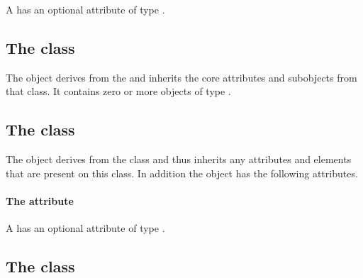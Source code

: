 A \CSGObject has an optional attribute  of type
.


\subsection{The  class}
\label{listofcsgnodes-class}


The \ListOfCSGNodes object derives from the  and inherits
the core attributes and subobjects from that class. It contains zero or
more objects of type \CSGNode.

\subsection{The  class}
\label{csgnode-class}




The \CSGNode object derives from the \SBase class and thus inherits any
attributes and elements that are present on this class.
In addition the \CSGNode object has the following attributes.

\paragraph{The \fixttspace{} attribute}

A \CSGNode has an optional attribute  of type .


\subsection{The  class}
\label{csgtransformation-class}



